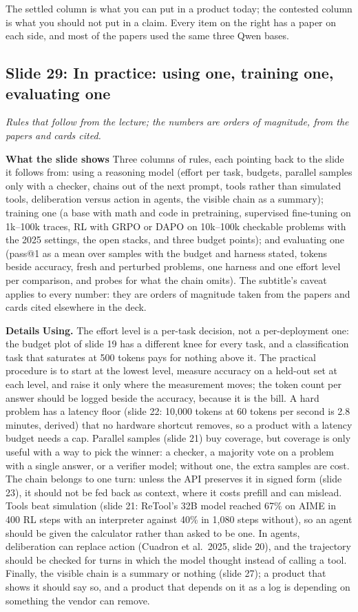 \documentclass[11pt,letterpaper]{article}
\newcommand{\slide}[3]{%
  \subsection[Slide #1: #2]{Slide #1: #2}%
  {\color{muted}\itshape #3\par}\medskip}
\newcommand{\para}[1]{\medskip\noindent\textbf{#1}\quad}
\newenvironment{intuition}{\begin{tcolorbox}[intuitionbox]}{\end{tcolorbox}}
\begin{document}
\begin{intuition}
The settled column is what you can put in a product today; the contested column is what you should not put in a claim. Every item on the right has a paper on each side, and most of the papers used the same three Qwen bases.
\end{intuition}

\slide{29}{In practice: using one, training one, evaluating one}{Rules that follow from the lecture; the numbers are orders of magnitude, from the papers and cards cited.}

\para{What the slide shows} Three columns of rules, each pointing back to the slide it follows from: using a reasoning model (effort per task, budgets, parallel samples only with a checker, chains out of the next prompt, tools rather than simulated tools, deliberation versus action in agents, the visible chain as a summary); training one (a base with math and code in pretraining, supervised fine-tuning on 1k--100k traces, RL with GRPO or DAPO on 10k--100k checkable problems with the 2025 settings, the open stacks, and three budget points); and evaluating one (pass@1 as a mean over samples with the budget and harness stated, tokens beside accuracy, fresh and perturbed problems, one harness and one effort level per comparison, and probes for what the chain omits). The subtitle's caveat applies to every number: they are orders of magnitude taken from the papers and cards cited elsewhere in the deck.

\para{Details} \textbf{Using.} The effort level is a per-task decision, not a per-deployment one: the budget plot of slide 19 has a different knee for every task, and a classification task that saturates at 500 tokens pays for nothing above it. The practical procedure is to start at the lowest level, measure accuracy on a held-out set at each level, and raise it only where the measurement moves; the token count per answer should be logged beside the accuracy, because it is the bill. A hard problem has a latency floor (slide 22: 10,000 tokens at 60 tokens per second is 2.8 minutes, derived) that no hardware shortcut removes, so a product with a latency budget needs a cap. Parallel samples (slide 21) buy coverage, but coverage is only useful with a way to pick the winner: a checker, a majority vote on a problem with a single answer, or a verifier model; without one, the extra samples are cost. The chain belongs to one turn: unless the API preserves it in signed form (slide 23), it should not be fed back as context, where it costs prefill and can mislead. Tools beat simulation (slide 21: ReTool's 32B model reached 67\% on AIME in 400 RL steps with an interpreter against 40\% in 1,080 steps without), so an agent should be given the calculator rather than asked to be one. In agents, deliberation can replace action (Cuadron et al.\ 2025, slide 20), and the trajectory should be checked for turns in which the model thought instead of calling a tool. Finally, the visible chain is a summary or nothing (slide 27); a product that shows it should say so, and a product that depends on it as a log is depending on something the vendor can remove.
\end{document}
